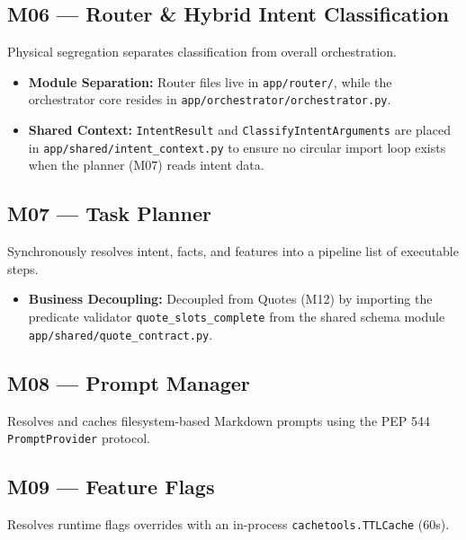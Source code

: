 \documentclass[11pt,a4paper]{article}
\begin{document}
\subsection{M06 — Router \& Hybrid Intent Classification}
Physical segregation separates classification from overall orchestration.
\begin{itemize}
    \item \textbf{Module Separation:} Router files live in \texttt{app/router/}, while the orchestrator core resides in \texttt{app/orchestrator/orchestrator.py}.
    \item \textbf{Shared Context:} \texttt{IntentResult} and \texttt{ClassifyIntentArguments} are placed in \texttt{app/shared/intent_context.py} to ensure no circular import loop exists when the planner (M07) reads intent data.
\end{itemize}

\subsection{M07 — Task Planner}
Synchronously resolves intent, facts, and features into a pipeline list of executable steps.
\begin{itemize}
    \item \textbf{Business Decoupling:} Decoupled from Quotes (M12) by importing the predicate validator \texttt{quote_slots_complete} from the shared schema module \texttt{app/shared/quote_contract.py}.
\end{itemize}

\subsection{M08 — Prompt Manager}
Resolves and caches filesystem-based Markdown prompts using the PEP 544 \texttt{PromptProvider} protocol.

\subsection{M09 — Feature Flags}
Resolves runtime flags overrides with an in-process \texttt{cachetools.TTLCache} (60s).
\end{document}
